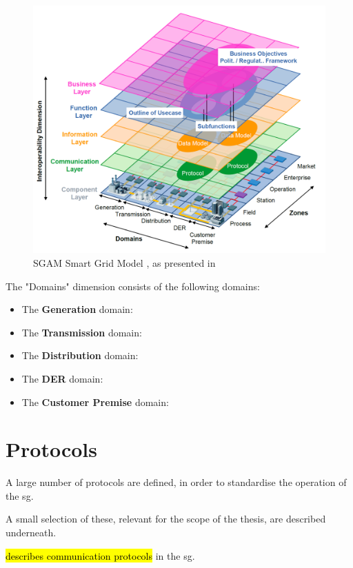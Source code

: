 \begin{figure}[ht]
\includegraphics[width=\textwidth]{figures/SGAM.png}
\caption[SGAM Smart Grid Model]{SGAM Smart Grid Model , as presented in \cite{uslar2019applying}}
\label{fig:SGAM}
\end{figure}

The "Domains" dimension consists of the following domains:

\begin{itemize}
    \item The \textbf{Generation} domain:
    \item The \textbf{Transmission} domain:
    \item The \textbf{Distribution} domain:
    \item The \textbf{DER} domain:
    \item The \textbf{Customer Premise} domain:
\end{itemize}




\section{Protocols}
A large number of protocols are defined, in order to standardise the operation of the \acrlong{sg}.

A small selection of these, relevant for the scope of the thesis, are described underneath.

\cite{2021arXiv210311657E} \hl{describes communication protocols} in the  \acrshort{sg}.





